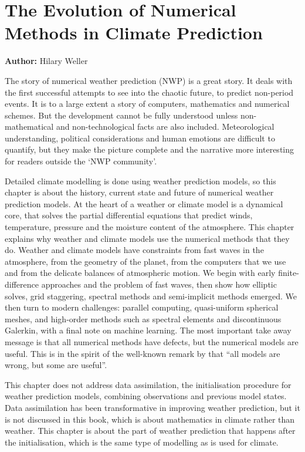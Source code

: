 \chapter{The Evolution of Numerical Methods in Climate Prediction}
\label{chap:climate_num}

\textbf{Author:} Hilary Weller

\epigraph{The story of numerical weather prediction (NWP) is a great story. It deals with the first successful attempts to see into the chaotic future, to predict non-period events. It is to a large extent a story of computers, mathematics and numerical schemes. But the development cannot be fully understood unless non-mathematical and non-technological facts are also included. Meteorological understanding, political considerations and human emotions are difficult to quantify, but they make the picture complete and the narrative more interesting for readers outside the `NWP community'.}
{\cite{Pers05a}}

Detailed climate modelling is done using weather prediction models,
so this chapter is about the history, current state and future of
numerical weather prediction models. At the heart of a weather or
climate model is a dynamical core, that solves the partial differential
equations that predict winds, temperature, pressure and the moisture
content of the atmosphere. This chapter explains why weather and climate
models use the numerical methods that they do. Weather and climate
models have constraints from fast waves in the atmosphere, from the
geometry of the planet, from the computers that we use and from the
delicate balances of atmospheric motion. We begin with early finite-difference
approaches and the problem of fast waves, then show how elliptic solves,
grid staggering, spectral methods and semi-implicit methods emerged.
We then turn to modern challenges: parallel computing, quasi-uniform
spherical meshes, and high-order methods such as spectral elements
and discontinuous Galerkin, with a final note on machine learning.
The most important take away message is that all numerical methods
have defects, but the numerical models are useful. This is in the
spirit of the well-known remark by \citet{BD87} that ``all models
are wrong, but some are useful''. 

This chapter does not address data assimilation, the initialisation
procedure for weather prediction models, combining observations and
previous model states. Data assimilation has been transformative in
improving weather prediction, but it is not discussed in this book,
which is about mathematics in climate rather than weather. This chapter
is about the part of weather prediction that happens after the initialisation,
which is the same type of modelling as is used for climate.

